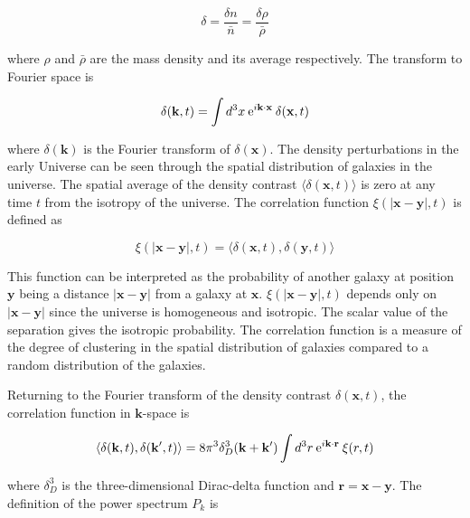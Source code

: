 \documentclass[twocolumn]{article}
\numberwithin{equation}{section}
\begin{document}
\begin{equation}
    \delta = \frac{\delta n}{\bar{n}}=\frac{\delta \rho}{\bar{\rho}}
\end{equation}

where $\rho$ and $\bar{\rho}$ are the mass density and its average respectively. The transform to Fourier space is 

\begin{equation}
    \delta(\mathbf{k}, t) = \int d^3x \: \textup{e}^{i\mathbf{k}\cdot\mathbf{x}} \: \delta(\mathbf{x},t)
\end{equation}

where $\delta(\mathbf{k})$ is the Fourier transform of $\delta(\mathbf{x})$. The density perturbations in the early Universe can be seen through the spatial distribution of galaxies in the universe. The spatial average of the density contrast $\langle \delta(\mathbf{x},t) \rangle$ is zero at any time $t$ from the isotropy of the universe. The correlation function $\xi(|\mathbf{x} - \mathbf{y}|,t)$ is defined as

\begin{equation}
    \xi(|\mathbf{x} - \mathbf{y}|,t) = \langle \delta(\mathbf{x}, t), \delta(\mathbf{y},t) \rangle
\end{equation}

This function can be interpreted as the probability of another galaxy at position $\mathbf{y}$ being a distance $|\mathbf{x} - \mathbf{y}|$ from a galaxy at $\mathbf{x}$. $\xi(|\mathbf{x} - \mathbf{y}|,t)$ depends only on $|\mathbf{x} - \mathbf{y}|$ since the universe is homogeneous and isotropic. The scalar value of the separation gives the isotropic probability. The correlation function is a measure of the degree of clustering in the spatial distribution of galaxies compared to a random distribution of the galaxies.

Returning to the Fourier transform of the density contrast $\delta(\mathbf{x},t)$, the correlation function in $\mathbf{k}$-space is 

\begin{equation}
    \langle \delta(\mathbf{k},t), \delta(\mathbf{k}',t) \rangle = 8\pi^3 \delta^3_D(\mathbf{k} + \mathbf{k}') \int d^3 r \: \textup{e}^{i\mathbf{k}\cdot\mathbf{r}} \: \xi(r,t)
\end{equation}

where $\delta_D^3$ is the three-dimensional Dirac-delta function and $\mathbf{r} = \mathbf{x}-\mathbf{y}$. The definition of the power spectrum $P_k$ is 
\end{document}

